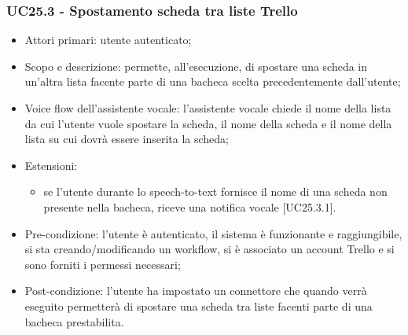 \subsubsection{UC25.3 - Spostamento scheda tra liste Trello}
\begin{itemize}
	\item  Attori primari: utente autenticato;
	\item  Scopo e descrizione: permette, all'esecuzione, di spostare una scheda in un'altra lista facente parte di una bacheca scelta precedentemente dall'utente;
	\item  Voice flow dell'assistente vocale: l'assistente vocale chiede il nome della lista da cui l'utente vuole spostare la scheda, il nome della scheda e il nome della lista su cui dovrà essere inserita la scheda;
	\item  Estensioni: 
		   \begin{itemize}
				\item se l'utente durante lo speech-to-text fornisce il nome di una scheda non presente nella bacheca, riceve una notifica vocale [UC25.3.1].
		   \end{itemize}
	\item  Pre-condizione: l'utente è autenticato, il sistema è funzionante e raggiungibile, si sta creando/modificando un workflow, si è associato un account Trello e si sono forniti i permessi necessari;
	\item  Post-condizione: l'utente ha impostato un connettore che quando verrà eseguito permetterà di spostare una scheda tra liste facenti parte di una bacheca prestabilita.
\end{itemize}
